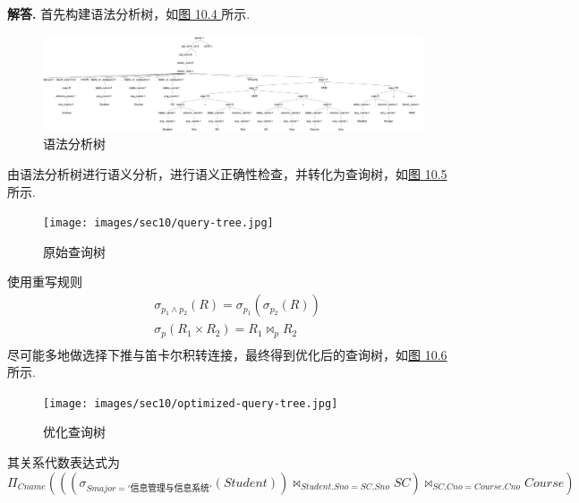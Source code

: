 \documentclass[12pt, oneside]{ctexart}
\numberwithin{figure}{section}
\numberwithin{table}{section}
\newenvironment{solution}{\par\noindent\textbf{解答. }}{\par}
\begin{document}
\begin{solution}
    首先构建语法分析树，如\hyperref[fig:语法分析树]{图 10.4 }所示.
    \begin{figure}[!htpb]
        \centering
        \includegraphics[width=\textwidth]{images/sec10/parser-tree.pdf}
        \caption{语法分析树}
        \label{fig:语法分析树}
    \end{figure}

    由语法分析树进行语义分析，进行语义正确性检查，并转化为查询树，如\hyperref[fig:原始查询树]{图 10.5 }所示.
    \begin{figure}[!htpb]
        \centering
        \texttt{[image: images/sec10/query-tree.jpg]}
        \caption{原始查询树}
        \label{fig:原始查询树}
    \end{figure}

    使用重写规则
    \begin{equation*}
        \begin{aligned}
            & \sigma_{p_1 \land p_2}(R) = \sigma_{p_1}\left(\sigma_{p_2}\left(R\right)\right) \\
            & \sigma_p\left(R_1 \times R_2\right) = R_1 \bowtie_p R_2 \\ 
        \end{aligned}
    \end{equation*}
    尽可能多地做选择下推与笛卡尔积转连接，最终得到优化后的查询树，如\hyperref[fig:优化查询树]{图 10.6 }所示.
    \begin{figure}[!htpb]
        \centering
        \texttt{[image: images/sec10/optimized-query-tree.jpg]}
        \caption{优化查询树}
        \label{fig:优化查询树}
    \end{figure}

    其关系代数表达式为
    \begin{equation*}
        \Pi_{Cname}\left(\left(\left(\sigma_{Smajor = '\text{信息管理与信息系统}'}\left(Student\right)\right) \bowtie_{Student.Sno = SC.Sno} SC\right) \bowtie_{SC.Cno = Course.Cno} Course\right)
    \end{equation*}
\end{solution}
\end{document}
